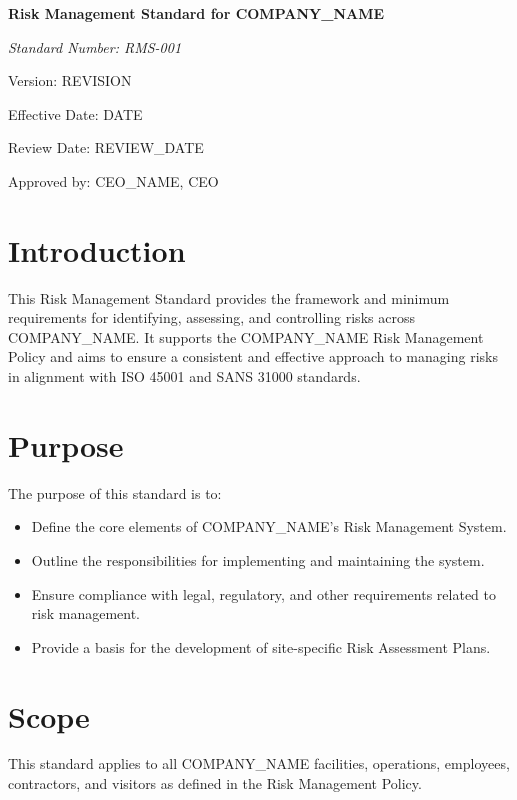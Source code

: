 \documentclass[12pt]{article}
\begin{document}
\begin{titlepage}
    \centering
    \vspace*{2cm}
    {\LARGE\bfseries Risk Management Standard for {{COMPANY_NAME}}\par}
    \vspace{1cm}
    {\large\itshape Standard Number: RMS-001\par}
    \vspace{0.5cm}
    {\normalsize Version: {{REVISION}}\par}
    \vspace{0.5cm}
    {\normalsize Effective Date: {{DATE}}\par}
    \vspace{0.5cm}
    {\normalsize Review Date: {{REVIEW_DATE}}\par}
    \vspace{2cm}
    {\normalsize Approved by: {{CEO_NAME}}, CEO\par}
\end{titlepage}

\section{Introduction}
This Risk Management Standard provides the framework and minimum requirements for identifying, assessing, and controlling risks across {{COMPANY_NAME}}. It supports the {{COMPANY_NAME}} Risk Management Policy and aims to ensure a consistent and effective approach to managing risks in alignment with ISO 45001 and SANS 31000 standards.

\section{Purpose}
The purpose of this standard is to:
\begin{itemize}
    \item Define the core elements of {{COMPANY_NAME}}'s Risk Management System.
    \item Outline the responsibilities for implementing and maintaining the system.
    \item Ensure compliance with legal, regulatory, and other requirements related to risk management.
    \item Provide a basis for the development of site-specific Risk Assessment Plans.
\end{itemize}

\section{Scope}
This standard applies to all {{COMPANY_NAME}} facilities, operations, employees, contractors, and visitors as defined in the Risk Management Policy.
\end{document}
